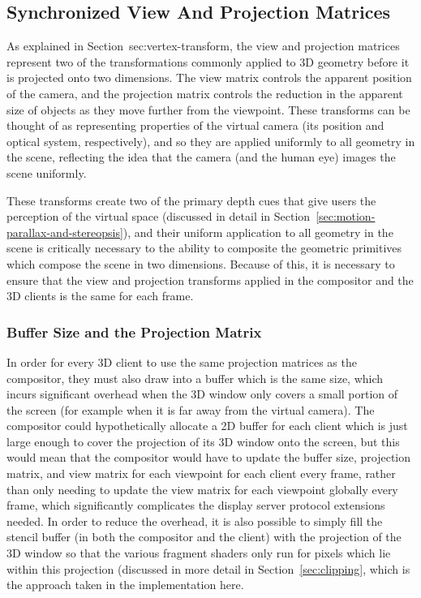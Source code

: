 \subsection{Synchronized View And Projection Matrices}
As explained in Section~{sec:vertex-transform}, the view and projection matrices represent two of the transformations commonly applied to 3D geometry before it is projected onto two dimensions. The view matrix controls the apparent position of the camera, and the projection matrix controls the reduction in the apparent size of objects as they move further from the viewpoint. These transforms can be thought of as representing properties of the virtual camera (its position and optical system, respectively), and so they are applied uniformly to all geometry in the scene, reflecting the idea that the camera (and the human eye) images the scene uniformly. 

These transforms create two of the primary depth cues that give users the perception of the virtual space (discussed in detail in Section~\ref{sec:motion-parallax-and-stereopsis}), and their uniform application to all geometry in the scene is critically necessary to the ability to composite the geometric primitives which compose the scene in two dimensions. Because of this, it is necessary to ensure that the view and projection transforms applied in the compositor and the 3D clients is the same for each frame. 

\subsubsection{Buffer Size and the Projection Matrix}

In order for every 3D client to use the same projection matrices as the compositor, they must also draw into a buffer which is the same size, which incurs significant overhead when the 3D window only covers a small portion of the screen (for example when it is far away from the virtual camera). The compositor could hypothetically allocate a 2D buffer for each client which is just large enough to cover the projection of its 3D window onto the screen, but this would mean that the compositor would have to update the buffer size, projection matrix, and view matrix for each viewpoint for each client every frame, rather than only needing to update the view matrix for each viewpoint globally every frame, which significantly complicates the display server protocol extensions needed. In order to reduce the overhead, it is also possible to simply fill the stencil buffer (in both the compositor and the client) with the projection of the 3D window so that the various fragment shaders only run for pixels which lie within this projection (discussed in more detail in Section~\ref{sec:clipping}, which is the approach taken in the implementation here.

